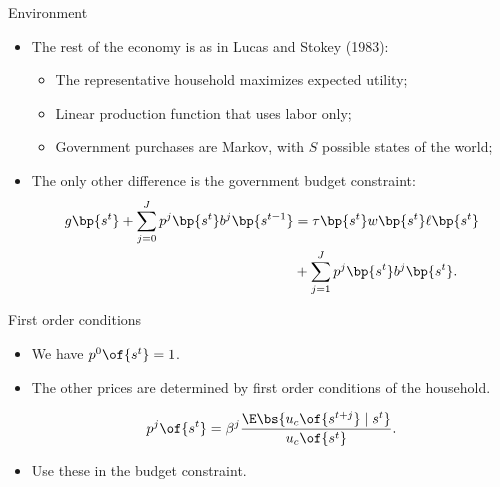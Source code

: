 \documentclass[11pt,xcolor={dvipsnames},aspectratio=159,hyperref={pdftex,pdfpagemode=UseNone,hidelinks,pdfdisplaydoctitle=true},usepdftitle=false]{beamer}
\begin{document}
\begin{frame}{Environment}
    \begin{itemize}
        \item The rest of the economy is as in Lucas and Stokey (1983):
        \begin{itemize}
        \item The representative household maximizes expected utility;
        \item Linear production function that uses labor only;
        \item Government purchases are Markov, with $S$ possible states of the world;
        \end{itemize}
        \item The only other difference is the government budget constraint: 
        \begin{align*}
            g\bp{s^t} +  \sum_{j=0}^J p^j\bp{s^t} b^j\bp{s^{t-1}} &= \tau\bp{s^t} w\bp{s^t} \ell\bp{s^t} \\
        & +   \sum_{j=1}^J p^j\bp{s^t} b^j\bp{s^t}.
        \end{align*}
        
        \end{itemize}

\end{frame}

\begin{frame}{First order conditions}
    \begin{itemize}
        \item We have $p^0\of{s^t} = 1$. 
        \item The other prices are determined by first order conditions of the household.
        
        \begin{align*}
        p^j\of{s^t} = \beta^j \frac{\E \bs{u_c\of{s^{t+j}}\mid s^t}}{u_c\of{s^t}}.
        \end{align*}
        \item Use these in the budget constraint.
        \end{itemize}
\end{frame}
\end{document}
